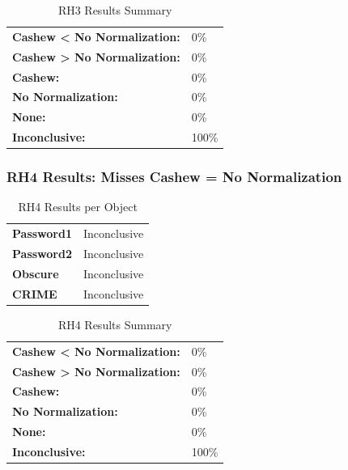 \documentclass{article}\usepackage[]{graphicx}\usepackage[]{color}
\begin{document}
	\begin{table}[H]
	\centering
	\caption{RH3 Results Summary}
	\begin{tabular}{ll}
	\textbf{Cashew \textless{} No Normalization:}& 0\% \\
	\textbf{Cashew \textgreater{} No Normalization:}& 0\%\\
	\textbf{Cashew:} & 0\%\\
	\textbf{No Normalization:} & 0\%\\
	\textbf{None:}& 0\%\\
	\textbf{Inconclusive:}& 100\%
			
	
	\end{tabular}
	\end{table}
	
	
	

	
	\subsubsection{RH4 Results: Misses Cashew = No Normalization}
	
	
	\begin{table}[H]
	\centering
	\caption{RH4 Results per Object}
	\begin{tabular}{ll}
	\textbf{Password1} & Inconclusive \\
	\textbf{Password2} & Inconclusive \\
	\textbf{Obscure} & Inconclusive \\
	\textbf{CRIME} & Inconclusive \\
	\end{tabular}
	\end{table}

	\begin{table}[H]
	\centering
	\caption{RH4 Results Summary}
	\begin{tabular}{ll}
	\textbf{Cashew \textless{} No Normalization:}& 0\% \\
	\textbf{Cashew \textgreater{} No Normalization:}& 0\%\\
	\textbf{Cashew:} & 0\%\\
	\textbf{No Normalization:} & 0\%\\
	\textbf{None:}& 0\%\\
	\textbf{Inconclusive:}& 100\%
			
	
	\end{tabular}
	\end{table}
	
	
	
\end{document}

